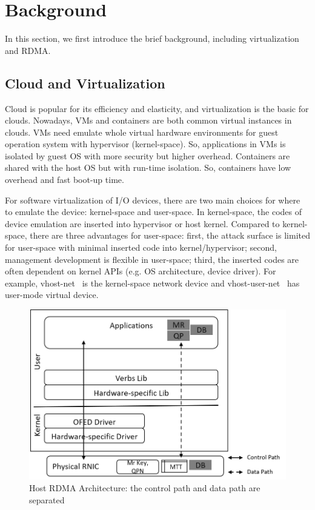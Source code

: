 \section{Background}
In this section, we first introduce the brief background, including virtualization and RDMA. 

\subsection{Cloud and Virtualization}
Cloud is popular for its efficiency and elasticity, and virtualization is the basic for clouds. Nowadays, VMs and containers are both common virtual instances in clouds. VMs need emulate whole virtual hardware environments for guest operation system with hypervisor (kernel-space). So, applications in VMs is isolated by guest OS with more security but higher overhead. Containers are shared with the host OS but with run-time isolation. So, containers have low overhead and fast boot-up time.

For software virtualization of I/O devices, there are two main choices for where to emulate the device: kernel-space and user-space. In kernel-space, the codes of device emulation are inserted into hypervisor or host kernel. Compared to kernel-space, there are three advantages for user-space: first, the attack surface is limited for user-space with minimal inserted code into kernel/hypervisor; second, management development is flexible in user-space; third, the inserted codes are often dependent on kernel APIs (e.g. OS architecture, device driver). For example, vhost-net~\cite{vhost-net} is the kernel-space network device and vhost-user-net~\cite{vhost-user-net} has user-mode virtual device. 

\begin{figure}[!ht]
\centering
\includegraphics[width=0.8\linewidth]{images/rdma-feat.png}
\caption{Host RDMA Architecture: the control path and data path are separated}
\label{fig:rdma-feat}
\end{figure}

